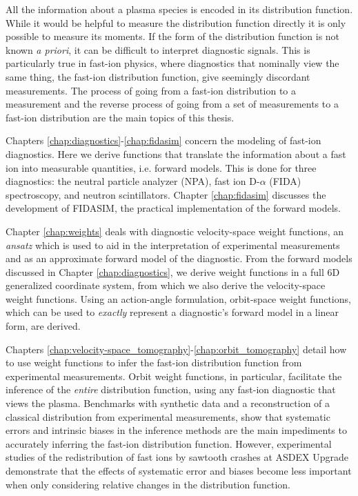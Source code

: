 \thesisabstract
{
All the information about a plasma species is encoded in its distribution function. While it would be helpful to measure the distribution function directly it is only possible to measure its moments. If the form of the distribution function is not known \textit{a priori}, it can be difficult to interpret diagnostic signals. This is particularly true in fast-ion physics, where diagnostics that nominally view the same thing, the fast-ion distribution function, give seemingly discordant measurements. The process of going from a fast-ion distribution to a measurement and the reverse process of going from a set of measurements to a fast-ion distribution are the main topics of this thesis.

Chapters \ref{chap:diagnostics}-\ref{chap:fidasim} concern the modeling of fast-ion diagnostics. Here we derive functions that translate the information about a fast ion into measurable quantities, i.e. forward models. This is done for three diagnostics: the neutral particle analyzer (NPA), fast ion D-$\alpha$ (FIDA) spectroscopy, and neutron scintillators. Chapter \ref{chap:fidasim} discusses the development of FIDASIM\cite{heidbrink2011code,geiger2013thesis,FIDASIM}, the practical implementation of the forward models.

Chapter \ref{chap:weights} deals with diagnostic velocity-space weight functions, an \textit{ansatz} which is used to aid in the interpretation of experimental measurements and as an approximate forward model of the diagnostic. From the forward models discussed in Chapter \ref{chap:diagnostics}, we derive weight functions in a full 6D generalized coordinate system, from which we also derive the velocity-space weight functions. Using an action-angle formulation, orbit-space weight functions, which can be used to \textit{exactly} represent a diagnostic's forward model in a linear form, are derived.

Chapters \ref{chap:velocity-space_tomography}-\ref{chap:orbit_tomography} detail how to use weight functions to infer the fast-ion distribution function from experimental measurements. Orbit weight functions, in particular, facilitate the inference of the \textit{entire} distribution function, using any fast-ion diagnostic that views the plasma. Benchmarks with synthetic data and a reconstruction of a classical distribution from experimental measurements, show that systematic errors and intrinsic biases in the inference methods are the main impediments to accurately inferring the fast-ion distribution function. However, experimental studies of the redistribution of fast ions by sawtooth crashes at ASDEX Upgrade demonstrate that the effects of systematic error and biases become less important when only considering relative changes in the distribution function. 
}


